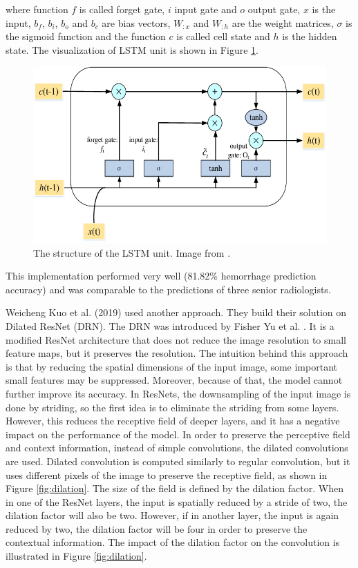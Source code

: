 \documentclass[thesis=B,english]{FITthesis}[2019/12/23]
\begin{document}
where function $f$ is called forget gate, $i$ input gate and $o$ output gate, $x$ is the input, $b_{f}$, $b_{i}$, $b_{o}$ and $b_{c}$ are bias vectors, $W_{:x}$ and $W_{:h}$ are the weight matrices, $\sigma$ is the sigmoid function and the function $c$ is called cell state and $h$ is the hidden state.\cite{yuan_li_wang_2020} The visualization of LSTM unit is shown in Figure \ref{fig:lstm}.
\begin{figure}[ht]
		\includegraphics[scale=0.4]{images/lstm.png}
		\centering
		\caption{The structure of the LSTM unit. Image from \cite{yuan_li_wang_2020}.}
		\label{fig:lstm}
\end{figure}

This implementation performed very well (81.82\% hemorrhage prediction accuracy) and was comparable to the predictions of three senior radiologists.

Weicheng Kuo et al. (2019) \cite{Kuo22737} used another approach. They build their solution on Dilated ResNet (DRN). The DRN was introduced by Fisher Yu et al. \cite{DBLP:journals/corr/YuKF17}. It is a modified ResNet architecture that does not reduce the image resolution to small feature maps, but it preserves the resolution. The intuition behind this approach is that by reducing the spatial dimensions of the input image, some important small features may be suppressed. Moreover, because of that, the model cannot further improve its accuracy. In ResNets, the downsampling of the input image is done by striding, so the first idea is to eliminate the striding from some layers. However, this reduces the receptive field of deeper layers, and it has a negative impact on the performance of the model. In order to preserve the perceptive field and context information, instead of simple convolutions, the dilated convolutions are used. Dilated convolution is computed similarly to regular convolution, but it uses different pixels of the image to preserve the receptive field, as shown in Figure \ref{fig:dilation}. The size of the field is defined by the dilation factor. When in one of the ResNet layers, the input is spatially reduced by a stride of two, the dilation factor will also be two. However, if in another layer, the input is again reduced by two, the dilation factor will be four in order to preserve the contextual information. The impact of the dilation factor on the convolution is illustrated in Figure \ref{fig:dilation}.
\end{document}
